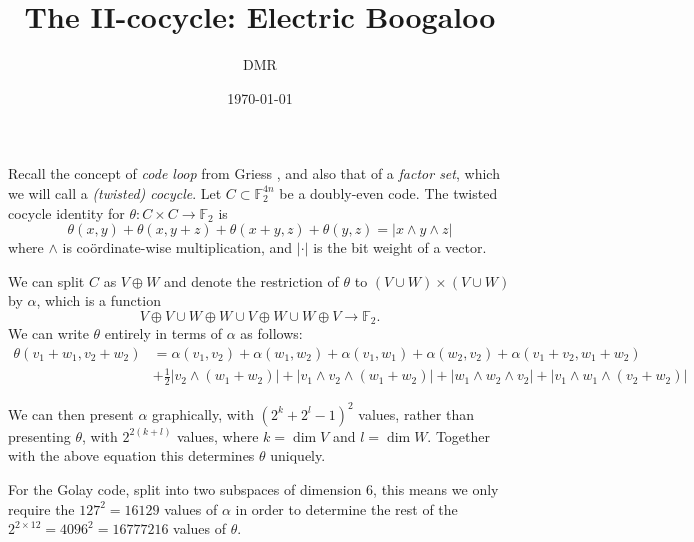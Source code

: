 \documentclass[nobib,a4paper,debug]{tufte-handout}
\title{The II-cocycle: Electric Boogaloo}
\date{\today}
\author{DMR}
\newcommand{\F}{\mathbb{F}}
\begin{document}
\maketitle

\noindent 
Recall the concept of \emph{code loop} from Griess \cite{Griess}
, and also that of a \emph{factor set}, 
which we will call a \emph{(twisted) cocycle}. 
Let $C \subset \F_2^{4n}$ be a doubly-even code.
The twisted cocycle identity for $\theta\colon C\times C \to \F_2$ is
\[
	\theta(x,y) + \theta(x,y+z) + \theta(x+y,z) + \theta(y,z) = |x\wedge y \wedge z|
\]
where $\wedge$ is co\"ordinate-wise multiplication, and $|\cdot|$ is the bit weight of a vector.

We can split $C$ as $V\oplus W$ and denote the restriction of $\theta$ to $(V\cup W)\times (V \cup W)$ by $\alpha$, which is a function
\[
	V\oplus V \cup W\oplus W \cup V\oplus W \cup W\oplus V \to \F_2.
\]
We can write $\theta$ entirely in terms of $\alpha$ as follows:
\begin{align*}
	\theta(v_1+w_1,v_2+w_2)	& = \alpha(v_1,v_2)  + \alpha(w_1,w_2) + \alpha(v_1,w_1) + \alpha(w_2,v_2) + \alpha(v_1+v_2,w_1+w_2)\\
							& + \frac12|v_2\wedge(w_1+w_2)| + |v_1\wedge v_2 \wedge (w_1+w_2)| + |w_1\wedge w_2 \wedge v_2| + |v_1\wedge w_1 \wedge (v_2 + w_2)|
\end{align*}

We can then present $\alpha$ graphically, with $(2^k + 2^l - 1)^2$ values, rather than presenting $\theta$, with $2^{2(k+l)}$ values, where $k=\dim V$ and $l=\dim W$. Together with the above equation this determines $\theta$ uniquely. 

For the Golay code, split into two subspaces of dimension 6, this means we only require the $127^2 = 16129$ values of $\alpha$ in order to determine the rest of the $2^{2\times 12} = 4096^2 = 16777216$ values of $\theta$.

\end{document}
